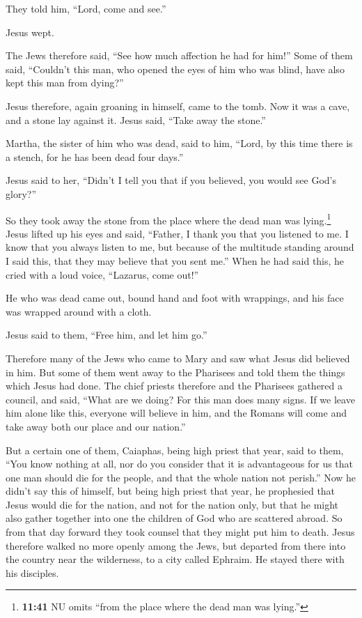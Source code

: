 \begin{paracol}{2}
\begin{otherlanguage}{english}
They told him, ``Lord, come and see.''

 Jesus wept.

 The Jews therefore said, ``See how much affection he had
for him!''  Some of them said, ``Couldn't this man, who
opened the eyes of him who was blind, have also kept this man from
dying?''

 Jesus therefore, again groaning in himself, came to the
tomb. Now it was a cave, and a stone lay against it. 
Jesus said, ``Take away the stone.''

Martha, the sister of him who was dead, said to him, ``Lord, by this
time there is a stench, for he has been dead four days.''

 Jesus said to her, ``Didn't I tell you that if you
believed, you would see God's glory?''

 So they took away the stone from the place where the
dead man was lying.\footnote{\textbf{11:41} NU omits ``from the place
  where the dead man was lying.''} Jesus lifted up his eyes and said,
``Father, I thank you that you listened to me.  I know
that you always listen to me, but because of the multitude standing
around I said this, that they may believe that you sent me.''
 When he had said this, he cried with a loud voice,
``Lazarus, come out!''

 He who was dead came out, bound hand and foot with
wrappings, and his face was wrapped around with a cloth.

Jesus said to them, ``Free him, and let him go.''

 Therefore many of the Jews who came to Mary and saw what
Jesus did believed in him.  But some of them went away to
the Pharisees and told them the things which Jesus had done.
 The chief priests therefore and the Pharisees gathered a
council, and said, ``What are we doing? For this man does many signs.
 If we leave him alone like this, everyone will believe
in him, and the Romans will come and take away both our place and our
nation.''

 But a certain one of them, Caiaphas, being high priest
that year, said to them, ``You know nothing at all,  nor
do you consider that it is advantageous for us that one man should die
for the people, and that the whole nation not perish.'' 
Now he didn't say this of himself, but being high priest that year, he
prophesied that Jesus would die for the nation,  and not
for the nation only, but that he might also gather together into one the
children of God who are scattered abroad.  So from that
day forward they took counsel that they might put him to death.
 Jesus therefore walked no more openly among the Jews,
but departed from there into the country near the wilderness, to a city
called Ephraim. He stayed there with his disciples.


\end{otherlanguage}
\end{paracol}
